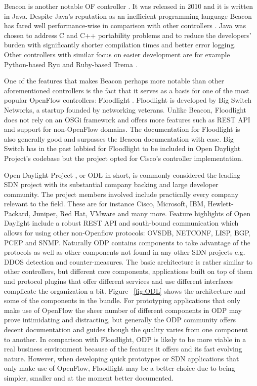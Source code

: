 	Beacon is another notable OF controller \cite{Beacon}. It was released in 2010 and it is written in Java. Despite Java’s reputation as an inefficient programming language Beacon has fared well performance-wise in comparison with other controllers \cite{Erickson13}. Java was chosen to address C and C++ portability problems and to reduce the developers’ burden with significantly shorter compilation times and better error logging. Other controllers with similar focus on easier development are for example Python-based Ryu \cite{Ryu} and Ruby-based Trema \cite{Trema}.

One of the features that makes Beacon perhaps more notable than other aforementioned controllers is the fact that it serves as a basis for one of the most popular OpenFlow controllers: Floodlight \cite{Floodlight}. Floodlight is developed by Big Switch Networks, a startup founded by networking veterans. Unlike Beacon, Floodlight does not rely on an OSGi framework and offers more features such as REST API and support for non-OpenFlow domains. The documentation for Floodlight is also generally good and surpasses the Beacon documentation with ease.
 Big Switch has in the past lobbied for Floodlight to be included in Open Daylight Project’s codebase \cite{BAN13} but the project opted for Cisco’s controller implementation. 

Open Daylight Project \cite{ODL}, or ODL in short, is commonly considered the leading SDN project with its substantial company backing and large developer community. The project members involved include practically every company relevant to the field. These are for instance Cisco, Microsoft, IBM, Hewlett-Packard, Juniper, Red Hat, VMware and many more. Feature highlights of Open Daylight include a robust REST API and south-bound communication which allows for using other non-Openflow protocols: OVSDB, NETCONF, LISP, BGP, PCEP and SNMP. Naturally ODP contains components to take advantage of the protocols as well as other components not found in any other SDN projects e.g. DDOS detection and counter-measures. The basic architecture is rather similar to other controllers, but different core components, applications built on top of them and protocol plugins that offer different services and use different interfaces complicate the organization a bit. Figure ~\ref{fig:ODL} shows the architecture and some of the components in the bundle. For prototyping applications that only make use of OpenFlow the sheer number of different components in ODP may prove intimidating and distracting, but generally the ODP community offers decent documentation and guides though the quality varies from one component to another. In comparison with Floodlight, ODP is likely to be more viable in a real business environment because of the features it offers and its fast evolving nature. However, when developing quick prototypes or SDN applications that only make use of OpenFlow, Floodlight may be a better choice due to being simpler, smaller and at the moment better documented.

